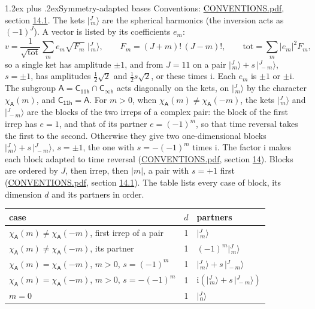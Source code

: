 \documentclass[10pt,a4paper]{article}
\makeatletter
\renewcommand\section{\@startsection{section}{1}{\z@}{-3ex plus -1ex minus -.2ex}%
  {1.2ex plus .2ex}{\normalfont\large\sffamily\bfseries\color{parttitle}}}
\numberwithin{equation}{section}
\newcommand{\grp}[1]{\mathsf{#1}}
\newcommand{\iunit}{\mathrm{i}}
\newcommand{\chiA}{\chi_{\grp{A}}}
\newcommand{\jm}[2]{\bigl\lvert{}^{#1}_{\,#2}\bigr\rangle}
\makeatother
\begin{document}
\section{Symmetry-adapted bases}\label{s:bases}
Conventions: \href{../../CONVENTIONS.pdf}{CONVENTIONS.pdf}, section \href{../../CONVENTIONS.pdf\#conv.14.1}{14.1}.
\leavevmode\label{n:index.m}\label{n:vector.ket}The kets $\jm{J}{m}$ are the spherical harmonics (the inversion acts as $(-1)^J$). \label{n:index.ketcoefficient}\label{n:vector.basis.symmetry}\label{n:index.ketweight}\label{n:index.total}A vector is listed by its coefficients $e_m$:
\begin{equation}\label{e:ket}v = \frac{1}{\sqrt{\mathrm{tot}}}\sum_m e_m\sqrt{F_m}\;\jm{J}{m},\qquad F_m = (J+m)!\,(J-m)!,\qquad \mathrm{tot} = \sum_m |e_m|^2F_m,\end{equation}
\leavevmode\label{n:index.pair.sign}so a single ket has amplitude $\pm1$, and from $J = 11$ on a pair $\jm{J}{m} + s\,\jm{J}{-m}$, $s = \pm1$, has amplitudes $\tfrac{1}{2}\sqrt{2}$ and $\tfrac{1}{2}s\sqrt{2}$, or these times $\iunit$. Each $e_m$ is $\pm1$ or $\pm\iunit$.
\leavevmode\label{n:group.A}\label{n:function.character.abelian}The subgroup $\grp{A} = \grp{C_{11h}}\cap\grp{C_{\infty h}}$ acts diagonally on the kets, on $\jm{J}{m}$ by the character $\chiA(m)$, and $\grp{C_{11h}} = \grp{A}$. For $m > 0$, when $\chiA(m) \ne \chiA(-m)$, the kets $\jm{J}{m}$ and $\jm{J}{-m}$ are the blocks of the two irreps of a complex pair: the block of the first irrep has $e = 1$, and that of its partner $e = (-1)^m$, so that time reversal takes the first to the second. Otherwise they give two one-dimensional blocks $\jm{J}{m} + s\,\jm{J}{-m}$, $s = \pm1$, the one with $s = -(-1)^m$ times $\iunit$. The factor $\iunit$ makes each block adapted to time reversal (\href{../../CONVENTIONS.pdf}{CONVENTIONS.pdf}, section \href{../../CONVENTIONS.pdf\#conv.14}{14}). Blocks are ordered by $J$, then irrep, then $|m|$, a pair with $s = +1$ first (\href{../../CONVENTIONS.pdf}{CONVENTIONS.pdf}, section \href{../../CONVENTIONS.pdf\#conv.14.1}{14.1}).
\leavevmode\label{n:head.case}\label{n:head.partners}The table lists every case of block, its dimension $d$ and its partners in order.
\begin{center}\begin{tabular}{@{}lrl@{}}\toprule
case & $d$ & partners\\\midrule
$\chiA(m) \ne \chiA(-m)$, first irrep of a pair & 1 & $\jm{J}{m}$\\
$\chiA(m) \ne \chiA(-m)$, its partner & 1 & $(-1)^m\jm{J}{m}$\\
$\chiA(m) = \chiA(-m)$, $m > 0$, $s = (-1)^m$ & 1 & $\jm{J}{m} + s\,\jm{J}{-m}$\\
$\chiA(m) = \chiA(-m)$, $m > 0$, $s = -(-1)^m$ & 1 & $\iunit(\jm{J}{m} + s\,\jm{J}{-m})$\\
$m = 0$ & 1 & $\jm{J}{0}$\\
\bottomrule\end{tabular}\end{center}
\end{document}
